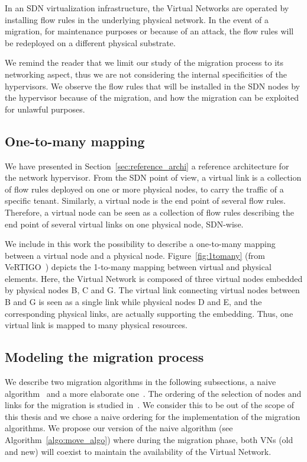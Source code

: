 \label{sec:model-migration}
In an SDN virtualization infrastructure, the Virtual Networks are operated by installing flow rules in the underlying physical network.
In the event of a migration, for maintenance purposes or because of an attack, the flow rules will be redeployed on a different physical substrate.

We remind the reader that we limit our study of the migration process to its networking aspect, thus we are not considering the internal specificities of the hypervisors.
We observe the flow rules that will be installed in the SDN nodes by the hypervisor because of the migration, and how the migration can be exploited for unlawful purposes.



\subsection{One-to-many mapping}
We have presented in Section~\ref{sec:reference_archi} a reference architecture for the network hypervisor.
From the SDN point of view, a virtual link is a collection of flow rules deployed on one or more physical nodes, to carry the traffic of a specific tenant.
Similarly, a virtual node is the end point of several flow rules.
Therefore, a virtual node can be seen as a collection of flow rules describing the end point of several virtual links on one physical node, SDN-wise.

We include in this work the possibility to describe a one-to-many mapping between a virtual node and a physical node.
Figure~\ref{fig:1tomany} (from VeRTIGO~\cite{VeRTIGO-Corin2012a}) depicts the 1-to-many mapping between virtual and physical elements. Here, the Virtual Network is composed of three virtual nodes embedded by physical nodes B, C and G.
The virtual link connecting virtual nodes between B and G is seen as a single link while physical nodes D and E, and the corresponding physical links, are actually supporting the embedding.
Thus, one virtual link is mapped to many physical resources.

\subsection{Modeling the migration process}
We describe two migration algorithms in the following subsections, a naive algorithm~\cite{Lime-Ghorbani2014} and a more elaborate one~\cite{vnm-lo2013}. 
The ordering of the selection of nodes and links for the migration is studied in~\cite{vnm-lo2013}. 
We consider this to be out of the scope of this thesis and we chose a naive ordering for the implementation of the migration algorithms.
We propose our version of the naive algorithm (see Algorithm~\ref{algo:move_algo}) where during the migration phase, both VNs (old and new) will coexist to maintain the availability of the Virtual Network.


